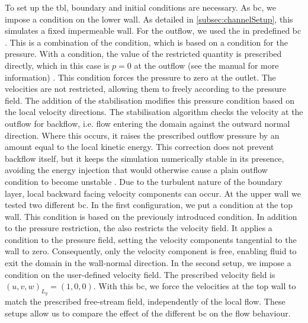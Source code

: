 To set up the \acrshort{tbl}, boundary and initial conditions are necessary. 
As \acrshort{bc}, we impose a  condition on the lower wall.
As detailed in \autoref{subsec:channelSetup}, this simulates a fixed impermeable wall.
For the outflow, we used the in  predefined \acrshort{bc} .
This is a combination of the  condition, which is based on a  condition for the pressure.
With a  condition, the value of the restricted quantity is prescribed directly, which in this case is $p = 0$ at the outflow (see the  manual for more information) \citep{jansson_neko_2024}.
This condition forces the pressure to zero at the outlet. 
The velocities are not restricted, allowing them to freely according to the pressure field.
The addition of the  stabilisation modifies this pressure condition based on the local velocity directions. 
The stabilisation algorithm checks the velocity at the outflow for backflow, i.e. flow entering the domain against the outward normal direction.
Where this occurs, it raises the prescribed outflow pressure by an amount equal to the local kinetic energy. 
This correction does not prevent backflow itself, but it keeps the simulation numerically stable in its presence, avoiding the energy injection that would otherwise cause a plain outflow condition to become unstable \citep{dong_robust_2014}.
Due to the turbulent nature of the boundary layer, local backward facing velocity components can occur.
At the upper wall we tested two different \acrshort{bc}.
In the first configuration, we put a  condition at the top wall.
This condition is based on the previously introduced  condition.
In addition to the pressure restriction, the  also restricts the velocity field.
It applies a  condition to the pressure field, setting the velocity components tangential to the wall to zero.
Consequently, only the  velocity component is free, enabling fluid to exit the domain in the wall-normal direction.
In the second setup, we impose a  condition on the user-defined velocity field.
The prescribed velocity field is $(u, v, w)_{L_y} = (1, 0, 0)$.
With this \acrshort{bc}, we force the velocities at the top wall to match the prescribed free-stream field, independently of the local flow.
These setups allow us to compare the effect of the different \acrlong{bc} on the flow behaviour. 

